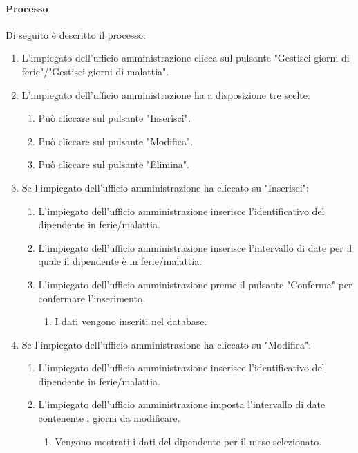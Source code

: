 \paragraph{Processo}
Di seguito è descritto il processo:
\begin{enumerate}
	\item L'impiegato dell'ufficio amministrazione clicca sul pulsante "Gestisci giorni di ferie"/"Gestisci giorni di malattia".
	\item L'impiegato dell'ufficio amministrazione ha a disposizione tre scelte:
		\begin{enumerate}
			\item Può cliccare sul pulsante "Inserisci".
			\item Può cliccare sul pulsante "Modifica".
			\item Può cliccare sul pulsante "Elimina".
		\end{enumerate}	
	\item Se l'impiegato dell'ufficio amministrazione ha cliccato su "Inserisci":
		\begin{enumerate}
			\item L'impiegato dell'ufficio amministrazione inserisce l'identificativo del dipendente in ferie/malattia.
			\item L'impiegato dell'ufficio amministrazione inserisce l'intervallo di date per il quale il dipendente è in ferie/malattia.
			\item L'impiegato dell'ufficio amministrazione preme il pulsante "Conferma" per confermare l'inserimento.
				\begin{enumerate}
					\item I dati vengono inseriti nel database.
				\end{enumerate}
		\end{enumerate}
	\item Se l'impiegato dell'ufficio amministrazione ha cliccato su "Modifica":
		\begin{enumerate}
			\item L'impiegato dell'ufficio amministrazione inserisce l'identificativo del dipendente in ferie/malattia.
			\item L'impiegato dell'ufficio amministrazione imposta l'intervallo di date contenente i giorni da modificare.
				\begin{enumerate}
					\item Vengono mostrati i dati del dipendente per il mese selezionato.
				\end{enumerate}

\end{enumerate}
\end{enumerate}
